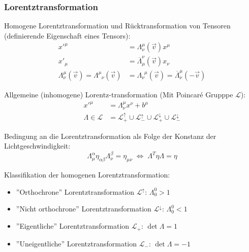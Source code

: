 \documentclass[11pt]{article}
\numberwithin{equation}{section}
\begin{document}
        \subsubsection{Lorentztransformation}
          Homogene Lorentztransformation und Rücktransformation von Tensoren (definierende Eigenschaft eines Tensors):
          \begin{equation}
            \begin{aligned}
              x'^\mu &=          \Lambda^{\mu}_{\nu}(\vec{v}) x^\mu \\
              x'_\mu &= \overline{\Lambda}_\mu^{\nu}(\vec{v}) x_\nu \\
              \Lambda^{\mu}_{\nu}(\vec{v}) = \Lambda^{\mu}_{\phantom{\mu}\nu}(\vec{v}) &= \Lambda^{\phantom{\nu}\mu}_{\nu}(\vec{v}) = \overline{\Lambda}^{\mu}_{\nu}(-\vec{v})
            \end{aligned}
          \end{equation}


          Allgemeine (inhomogene) Lorentz-transformation (Mit Poincaré Grupppe $\mathcal{L}$):
          \begin{equation}
            \begin{aligned}
              x'^\mu &= \Lambda^\mu_{\nu} x^\nu + b^\mu \\
              \Lambda \in \mathcal{L} &= \mathcal{L}^\uparrow_+ \cup \mathcal{L}^\uparrow_- \cup \mathcal{L}^\downarrow_+ \cup \mathcal{L}^\downarrow_-
            \end{aligned}
          \end{equation}

          Bedingung an die Lorentztransformation als Folge der Konstanz der Lichtgeschwindigkeit:
          \begin{equation}
            \Lambda^{\alpha}_{\mu} \eta_{\alpha\beta} \Lambda^{\beta}_{\nu} = \eta_{\mu\nu}
             \;\Leftrightarrow\; \Lambda^T \eta \Lambda = \eta
          \end{equation}

          Klassifikation der homogenen Lorentztransformation:
          \begin{itemize}
            \item ''Orthochrone'' Lorentztransformation $\mathcal{L}^\uparrow$: $\Lambda^0_0 > 1$
            \item ''Nicht orthochrone'' Lorentztransformation $\mathcal{L}^\downarrow$: $\Lambda^0_0 < 1$
            \item ''Eigentliche'' Lorentztransformation $\mathcal{L}_+$: $\det\Lambda = 1$
            \item ''Uneigentliche'' Lorentztransformation $\mathcal{L}_-$: $\det\Lambda = -1$
          \end{itemize}
\end{document}
